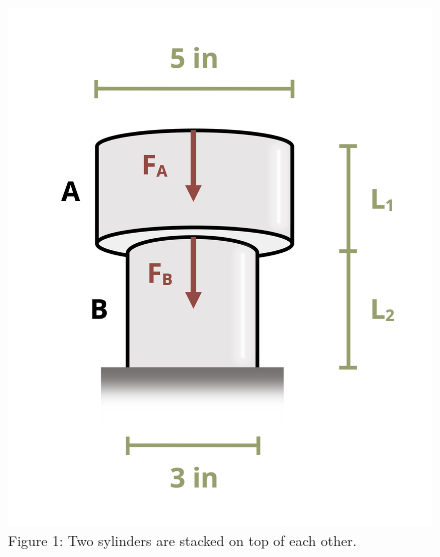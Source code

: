 \documentclass[
  letterpaper,
  DIV=11,
  numbers=noendperiod]{scrreprt}
\begin{document}
\begin{figure}[H]

{\centering \includegraphics{images/139.png}

}

\caption{Figure 1: Two sylinders are stacked on top of each other.}

\end{figure}%
\end{document}

